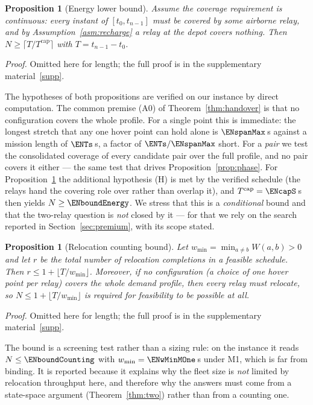 \documentclass[11pt]{article}
\theoremstyle{dshplain}
\newtheorem{proposition}[theorem]{Proposition}
\theoremstyle{dshdefn}
\begin{document}
\begin{proposition}[Energy lower bound]
\label{prop:energy}
Assume the coverage requirement is \emph{continuous}: every instant of
$[t_0,t_{n-1}]$ must be covered by some airborne relay, and by
Assumption~\ref{asm:recharge} a relay at the depot covers nothing. Then
$N\ge\bigl\lceil T/T^{\mathrm{cap}}\bigr\rceil$ with $T=t_{n-1}-t_0$.
\end{proposition}
\noindent\emph{Proof.} Omitted here for length; the full proof is in the supplementary material~\ref{supp}.


\noindent The hypotheses of both propositions are verified on our instance by
direct computation. The common premise (A0) of Theorem~\ref{thm:handover} is
that no configuration covers the whole profile. For a single point this is
immediate: the longest stretch that any one hover point can hold alone is
$\ENspanMax$\,s against a mission length of $\ENTs$\,s, a factor of
$\ENTs/\ENspanMax$ short. For a \emph{pair} we test the consolidated coverage of
every candidate pair over the full profile, and no pair covers it either --- the
same test that drives Proposition~\ref{prop:phase}. For
Proposition~\ref{prop:energy} the additional hypothesis (H) is met by the verified
schedule (the relays hand the covering role over rather than overlap it), and
$T^{\mathrm{cap}}=\ENcapS$\,s then yields $N\ge\ENboundEnergy$. We stress that this
is a \emph{conditional} bound and that the two-relay question is \emph{not} closed
by it --- for that we rely on the search reported in
Section~\ref{sec:premium}, with its scope stated.

\begin{proposition}[Relocation counting bound]
\label{prop:structural}
Let $w_{\min}=\min_{a\neq b}W(a,b)>0$ and let $r$ be the total number of
relocation completions in a feasible schedule. Then
$r\le 1+\lfloor T/w_{\min}\rfloor$. Moreover, if no \emph{configuration} (a
choice of one hover point per relay) covers the whole demand profile, then every
relay must relocate, so $N\le 1+\lfloor T/w_{\min}\rfloor$ is required for
feasibility to be possible at all.
\end{proposition}
\noindent\emph{Proof.} Omitted here for length; the full proof is in the supplementary material~\ref{supp}.


\noindent The bound is a screening test rather than a sizing rule: on the instance
it reads $N\le\ENboundCounting$ with $w_{\min}=\ENwMinMOne$\,s under M1, which is
far from binding. It is reported because it explains why the fleet size is
\emph{not} limited by relocation throughput here, and therefore why the answers
must come from a state-space argument (Theorem~\ref{thm:two}) rather than from a
counting one.
\end{document}
